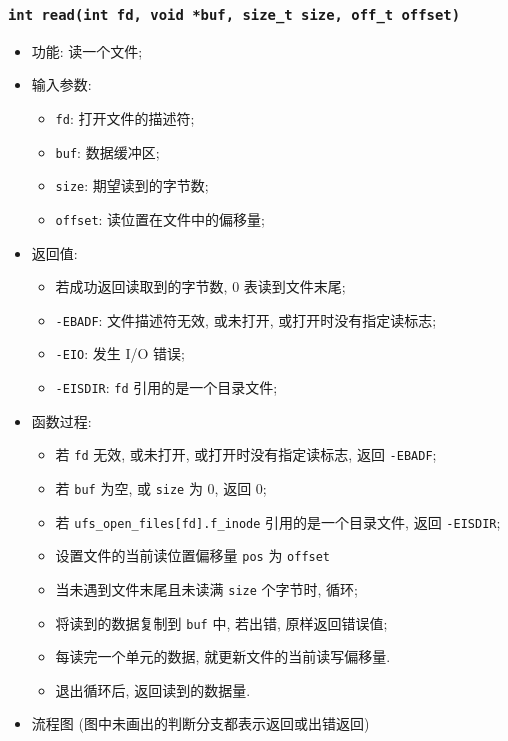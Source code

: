 \documentclass[nofonts, titlepage]{ctexart}
\begin{document}
  \subsubsection[\texttt{read}]{\texttt{int read(int fd, void *buf,
  size\_t size, off\_t offset)}}
  \begin{itemize}
\item
  功能: 读一个文件;
\item
  输入参数:

  \begin{itemize}
  \item
    \texttt{fd}: 打开文件的描述符;
  \item
    \texttt{buf}: 数据缓冲区;
  \item
    \texttt{size}: 期望读到的字节数;
  \item
    \texttt{offset}: 读位置在文件中的偏移量;
  \end{itemize}
\item
  返回值:

  \begin{itemize}
  \item
    若成功返回读取到的字节数, 0 表读到文件末尾;
  \item
    \texttt{-EBADF}: 文件描述符无效, 或未打开, 或打开时没有指定读标志;
  \item
    \texttt{-EIO}: 发生 I/O 错误;
  \item
    \texttt{-EISDIR}: \texttt{fd} 引用的是一个目录文件;
  \end{itemize}
\item
  函数过程:

  \begin{itemize}
  \item
    若 \texttt{fd} 无效, 或未打开, 或打开时没有指定读标志, 返回
    \texttt{-EBADF};
  \item
    若 \texttt{buf} 为空, 或 \texttt{size} 为 0, 返回 0;
  \item
    若 \texttt{ufs\_open\_files{[}fd{]}.f\_inode} 引用的是一个目录文件,
    返回 \texttt{-EISDIR};
  \item
      设置文件的当前读位置偏移量 \texttt{pos} 为 \texttt{offset}
  \item
    当未遇到文件末尾且未读满 \texttt{size} 个字节时, 循环;
  \item
    将读到的数据复制到 \texttt{buf} 中, 若出错, 原样返回错误值;
  \item
    每读完一个单元的数据, 就更新文件的当前读写偏移量.
  \item
    退出循环后, 返回读到的数据量.
  \end{itemize}
\item
  流程图
  (图中未画出的判断分支都表示返回或出错返回)


\end{itemize}
\end{document}
